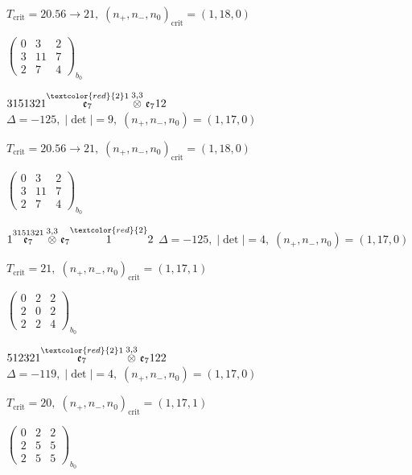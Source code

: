 \documentclass[10pt]{article}
\begin{document}
\hspace{1em}$T_{\text{crit}}=20.56 \to 21,\; (n_+,n_-,n_0)_{\text{crit}}=(1,18,0)$

\hspace{2em}$\left(\begin{smallmatrix}0 & 3 & 2 \\ 3 & 11 & 7 \\ 2 & 7 & 4\end{smallmatrix}\right)_{\!b_0}$

\smallskip

$3151321\overset{\textcolor{red}{2}1}{\mathfrak{e}_7}\overset{3,3}{\otimes}\mathfrak{e}_712$ \quad $\Delta=-125,\; |\det|=9,\; (n_+,n_-,n_0)=(1,17,0)$

\hspace{1em}$T_{\text{crit}}=20.56 \to 21,\; (n_+,n_-,n_0)_{\text{crit}}=(1,18,0)$

\hspace{2em}$\left(\begin{smallmatrix}0 & 3 & 2 \\ 3 & 11 & 7 \\ 2 & 7 & 4\end{smallmatrix}\right)_{\!b_0}$

$1\overset{3151321}{\mathfrak{e}_7}\overset{3,3}{\otimes}\mathfrak{e}_7\overset{\textcolor{red}{2}}{1}2$ \quad $\Delta=-125,\; |\det|=4,\; (n_+,n_-,n_0)=(1,17,0)$

\hspace{1em}$T_{\text{crit}}=21,\; (n_+,n_-,n_0)_{\text{crit}}=(1,17,1)$

\hspace{2em}$\left(\begin{smallmatrix}0 & 2 & 2 \\ 2 & 0 & 2 \\ 2 & 2 & 4\end{smallmatrix}\right)_{\!b_0}$

\smallskip

$512321\overset{\textcolor{red}{2}1}{\mathfrak{e}_7}\overset{3,3}{\otimes}\mathfrak{e}_7122$ \quad $\Delta=-119,\; |\det|=4,\; (n_+,n_-,n_0)=(1,17,0)$

\hspace{1em}$T_{\text{crit}}=20,\; (n_+,n_-,n_0)_{\text{crit}}=(1,17,1)$

\hspace{2em}$\left(\begin{smallmatrix}0 & 2 & 2 \\ 2 & 5 & 5 \\ 2 & 5 & 5\end{smallmatrix}\right)_{\!b_0}$
\end{document}
